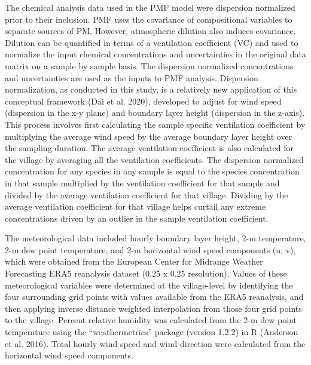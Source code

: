 \documentclass[
  letterpaper,
  DIV=11,
  numbers=noendperiod]{scrartcl}
\begin{document}
The chemical analysis data used in the PMF model were dispersion
normalized prior to their inclusion. PMF uses the covariance of
compositional variables to separate sources of PM. However, atmospheric
dilution also induces covariance. Dilution can be quantified in terms of
a ventilation coefficient (VC) and used to normalize the input chemical
concentrations and uncertainties in the original data matrix on a sample
by sample basis. The dispersion normalized concentrations and
uncertainties are used as the inputs to PMF analysis. Dispersion
normalization,  as conducted in this study, is a
relatively new application of this conceptual framework (Dai et al.
2020), developed to adjust for wind speed (dispersion in the x-y plane)
and boundary layer height (dispersion in the z-axis). This process
involves first calculating the sample specific ventilation coefficient
by multiplying the average wind speed by the average boundary layer
height over the sampling duration. The average ventilation coefficient
is also calculated for the village by averaging all the ventilation
coefficients. The dispersion normalized concentration for any species in
any sample is equal to the species concentration in that sample
multiplied by the ventilation coefficient for that sample and divided by
the average ventilation coefficient for that village. Dividing by the
average ventilation coefficient for that village helps curtail any
extreme concentrations driven by an outlier in the sample ventilation
coefficient.

The meteorological data included hourly boundary layer height, 2-m
temperature, 2-m dew point temperature, and 2-m horizontal wind speed
components (u, v), which were obtained from the European Center for
Midrange Weather Forecasting ERA5 reanalysis dataset (0.25 x 0.25
resolution). Values of these meteorological variables were determined at
the village-level by identifying the four surrounding grid points with
values available from the ERA5 reanalysis, and then applying inverse
distance weighted interpolation from those four grid points to the
village. Percent relative humidity was calculated from the 2-m dew point
temperature using the ``weathermetrics'' package (version 1.2.2) in R
(Anderson et al. 2016). Total hourly wind speed and wind direction were
calculated from the horizontal wind speed components.
\end{document}
